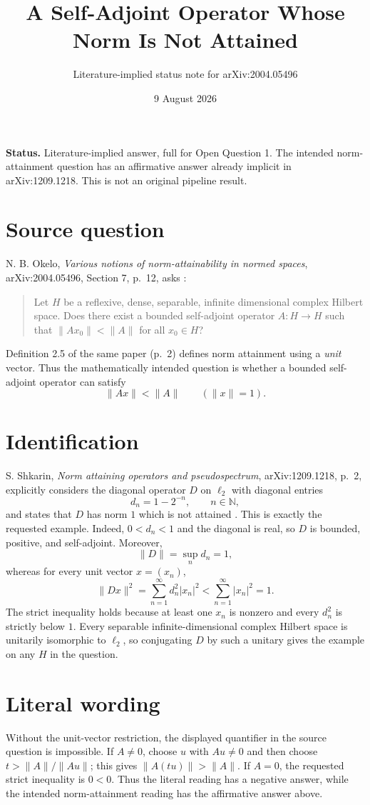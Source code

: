 \documentclass[11pt]{article}
\title{A Self-Adjoint Operator Whose Norm Is Not Attained}
\author{Literature-implied status note for arXiv:2004.05496}
\date{9 August 2026}
\begin{document}
\maketitle

\noindent\colorbox{softgray}{\parbox{0.94\linewidth}{
\textbf{Status.} \textcolor{statusblue}{Literature-implied answer, full for
Open Question 1.} The intended norm-attainment question has an affirmative
answer already implicit in arXiv:1209.1218. This is not an original pipeline
result.
}}

\section*{Source question}
N. B. Okelo, \emph{Various notions of norm-attainability in normed spaces},
arXiv:2004.05496, Section 7, p.~12, asks \cite{Okelo}:
\begin{quote}
Let $H$ be a reflexive, dense, separable, infinite dimensional complex
Hilbert space. Does there exist a bounded self-adjoint operator
$A:H\to H$ such that $\|Ax_0\|<\|A\|$ for all $x_0\in H$?
\end{quote}
Definition 2.5 of the same paper (p.~2) defines norm attainment using a
\emph{unit} vector. Thus the mathematically intended question is whether a
bounded self-adjoint operator can satisfy
\[
  \|Ax\|<\|A\| \qquad (\|x\|=1).
\]

\section*{Identification}
S. Shkarin, \emph{Norm attaining operators and pseudospectrum},
arXiv:1209.1218, p.~2, explicitly considers the diagonal operator $D$ on
$\ell_2$ with diagonal entries
\[
  d_n=1-2^{-n}, \qquad n\in\mathbb N,
\]
and states that $D$ has norm $1$ which is not attained \cite{Shkarin}.
This is exactly the requested example. Indeed, $0<d_n<1$ and the diagonal is
real, so $D$ is bounded, positive, and self-adjoint. Moreover,
\[
 \|D\|=\sup_n d_n=1,
\]
whereas for every unit vector $x=(x_n)$,
\[
 \|Dx\|^2=\sum_{n=1}^{\infty}d_n^2|x_n|^2
 <\sum_{n=1}^{\infty}|x_n|^2=1.
\]
The strict inequality holds because at least one $x_n$ is nonzero and every
$d_n^2$ is strictly below $1$. Every separable infinite-dimensional complex
Hilbert space is unitarily isomorphic to $\ell_2$, so conjugating $D$ by such
a unitary gives the example on any $H$ in the question.

\section*{Literal wording}
Without the unit-vector restriction, the displayed quantifier in the source
question is impossible. If $A\ne0$, choose $u$ with $Au\ne0$ and then choose
$t>\|A\|/\|Au\|$; this gives $\|A(tu)\|>\|A\|$. If $A=0$, the requested strict
inequality is $0<0$. Thus the literal reading has a negative answer, while the
intended norm-attainment reading has the affirmative answer above.
\end{document}
